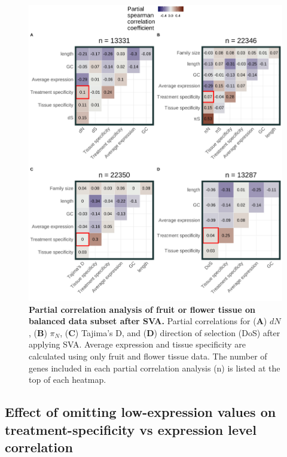 \documentclass[12pt]{article}
\begin{document}
\begin{figure}[H]
\centering
\includegraphics[width = \linewidth]{figures/appendix_a/partialCorrelations_fullyBalancedSubset_flowerORfruit_2023-02-22.pdf}
\caption{\textbf{Partial correlation analysis of fruit or flower tissue on balanced data subset after SVA.} Partial correlations for (\textbf{A}) $dN$, (\textbf{B}) $\pi_N$, (\textbf{C}) Tajima's D, and (\textbf{D}) direction of selection (DoS) after applying SVA. Average expression and tissue specificity are calculated using only fruit and flower tissue data. The number of genes included in each partial correlation analysis (n) is listed at the top of each heatmap.}%
\end{figure}

\subsection*{Effect of omitting low-expression values on treatment-specificity vs expression level correlation}
\end{document}
